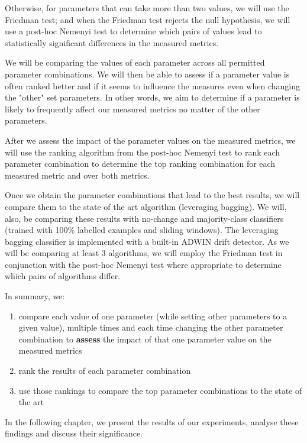Otherwise, for parameters that can take more than two values, we will use the Friedman test; and when the Friedman test rejects the null hypothesis, we will use a post-hoc Nemenyi test to determine which pairs of values lead to statistically significant differences in the measured metrics.

We will be comparing the values of each parameter across all permitted parameter combinations. We will then be able to assess if a parameter value is often ranked better and if it seems to influence the measures even when changing the "other" set parameters. In other words, we aim to determine if a parameter is likely to frequently affect our measured metrics no matter of the other parameters.

After we assess the impact of the parameter values on the measured metrics, we will use the ranking algorithm from the post-hoc Nemenyi test to rank each parameter combination to determine the top ranking combination for each measured metric and over both metrics.

Once we obtain the parameter combinations that lead to the best results, we will compare them to the state of the art algorithm (leveraging bagging). We will, also, be comparing these results with no-change and majority-class classifiers (trained with 100\% labelled examples and sliding windows). The leveraging bagging classifier is implemented with a built-in ADWIN drift detector. As we will be comparing at least 3 algorithms, we will employ the Friedman test in conjunction with the post-hoc Nemenyi test where appropriate to determine which pairs of algorithms differ.

In summary, we:
\begin{enumerate}
\item compare each value of one parameter (while setting other parameters to a given value), multiple times and each time changing the other parameter combination to \textbf{assess} the impact of that one parameter value on the measured metrics
\item rank the results of each parameter combination
\item use those rankings to compare the top parameter combinations to the state of the art
\end{enumerate}

In the following chapter, we present the results of our experiments, analyse these findings and discuss their significance.